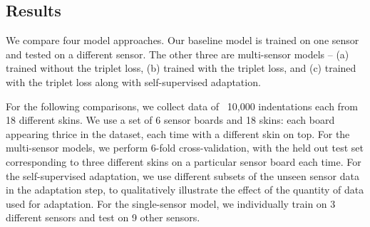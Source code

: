 \documentclass{article}
\begin{document}
\subsection{Results}
\vspace{-0.1in}
We compare four model approaches. Our baseline model is trained on one sensor and tested on a different sensor. The other three are multi-sensor models -- (a) trained without the triplet loss, (b) trained with the triplet loss, and (c) trained with the triplet loss along with self-supervised adaptation.

For the following comparisons, we collect data of ~10,000 indentations each from 18 different skins. We use a set of 6 sensor boards and 18 skins: each board appearing thrice in the dataset, each time with a different skin on top. For the multi-sensor models, we perform 6-fold cross-validation, with the held out test set corresponding to three different skins on a particular sensor board each time. For the self-supervised adaptation, we use different subsets of the unseen sensor data in the adaptation step, to qualitatively illustrate the effect of the quantity of data used for adaptation. For the single-sensor model, we individually train on 3 different sensors and test on 9 other sensors. 

\renewcommand{\arraystretch}{1.3}
\captionsetup[table]{skip=10pt}
\end{document}
